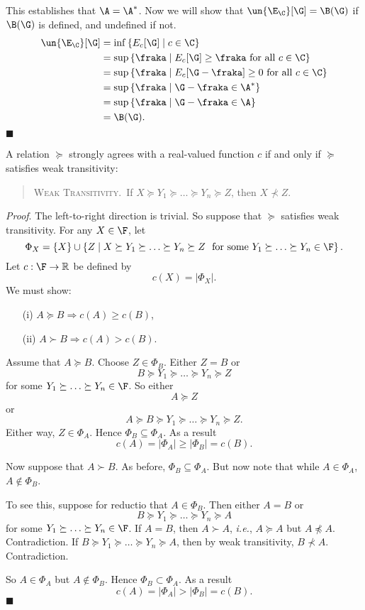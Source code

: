 This establishes that $\A=\A^*$. Now we will show that $\un{\E_\C}[\G]=\B(\G)$ if $\B(\G)$ is defined, and undefined if not.
$$
\begin{aligned}
\un{\E_\C}[\G] &= \inf\left\{E_c[\G] \mathrel{|} c\in\C\right\}\\
               &= \sup\left\{\fraka \mathrel{|} E_c[\G]\geq\fraka\text{ for all } c\in\C\right\}\\
               &= \sup\left\{\fraka \mathrel{|} E_c[\G-\fraka]\geq0\text{ for all } c\in\C\right\}\\
							 &= \sup\left\{\fraka \mathrel{|} \G-\fraka\in\A^*\right\}\\
							 &= \sup\left\{\fraka \mathrel{|} \G-\fraka\in\A\right\}\\
							 &= \B(\G).
\end{aligned}
$$
\hfill $\blacksquare$

\begin{theorem} A relation $\succeq$ strongly agrees with a real-valued function $c$ if and only if $\succeq$ satisfies weak transitivity:
	\begin{quote}
	\textsc{Weak Transitivity}.\, If $X\succeq Y_1\succeq\hdots\succeq Y_n\succeq Z$, then $X\not\prec Z$.
	\end{quote}
\end{theorem}

\noindent\textit{Proof}. The left-to-right direction is trivial. So suppose that $\succeq$ satisfies weak transitivity. For any $X\in\F$, let
$$ \Phi_X=\left\{X\right\}\cup\left\{Z \mathrel{|} X\succeq Y_1\succeq\ldots\succeq Y_n\succeq Z \
\text{ for some }Y_1\succeq\hdots\succeq Y_n\in\F\right\}. $$
Let $c:\F\rightarrow\mathbb{R}$ be defined by
$$ c(X)=|\Phi_X|. $$
We must show: 
\begin{enumerate}
\item[(i)] $A\succeq B \Rightarrow c(A)\geq c(B)$,
\item[(ii)] $A\succ B \Rightarrow c(A)>c(B)$.
\end{enumerate}

Assume that $A\succeq B$. Choose $Z\in\Phi_B$. Either $Z=B$ or
$$ B\succeq Y_1\succeq\hdots\succeq Y_n\succeq Z $$
for some $Y_1\succeq\hdots\succeq Y_n\in\F$. So either
$$ A\succeq Z $$
or
$$ A\succeq B\succeq Y_1\succeq\hdots\succeq Y_n\succeq Z. $$
Either way, $Z\in\Phi_A$. Hence $\Phi_B\subseteq\Phi_A$. As a result
$$ c(A)=|\Phi_A|\geq|\Phi_B|=c(B). $$

Now suppose that $A\succ B$. As before, $\Phi_B\subseteq\Phi_A$. But now note that while $A\in\Phi_A$, $A\not\in\Phi_B$.

To see this, suppose for reductio that $A\in\Phi_B$. Then either $A=B$ or 
$$ B\succeq Y_1\succeq\hdots\succeq Y_n\succeq A $$
for some $Y_1\succeq\hdots\succeq Y_n\in\F$. If $A=B$, then $A\succ A$, \textit{i.e.}, $A\succeq A$ but $A\not\preceq A$. Contradiction. If $B\succeq Y_1\succeq\hdots\succeq Y_n\succeq A$, then by weak transitivity, $B\not\prec A$. Contradiction.

So $A\in\Phi_A$ but $A\not\in\Phi_B$. Hence $\Phi_B\subset\Phi_A$. As a result
$$ c(A)=|\Phi_A|>|\Phi_B|=c(B). $$
\hfill$\blacksquare$